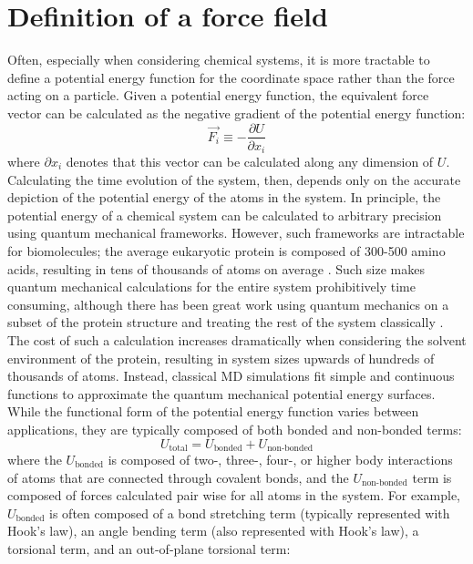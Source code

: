 \section{Definition of a force field}

Often, especially when considering chemical systems, it is more tractable to define a potential energy function for the coordinate space rather than the force acting on a particle. 
Given a potential energy function, the equivalent force vector can be calculated as the negative gradient of the potential energy function: 
\begin{equation} 
    \vec{F_i} \equiv -\frac{\partial U}{\partial x_i}
\end{equation}
where $\partial x_i$ denotes that this vector can be calculated along any dimension of $U$. 
Calculating the time evolution of the system, then, depends only on the accurate depiction of the potential energy of the atoms in the system. 
In principle, the potential energy of a chemical system can be calculated to arbitrary precision using quantum mechanical frameworks. 
However, such frameworks are intractable for biomolecules; the average eukaryotic protein is composed of 300-500 amino acids, resulting in tens of thousands of atoms on average \cite{Kozlowski2017}. 
Such size makes quantum mechanical calculations for the entire system prohibitively time consuming, although there has been great work using quantum mechanics on a subset of the protein structure and treating the rest of the system classically \cite{Senn2009, Tichauer2018}.
The cost of such a calculation increases dramatically when considering the solvent environment of the protein, resulting in system sizes upwards of hundreds of thousands of atoms. 
Instead, classical MD simulations fit simple and continuous functions to approximate the quantum mechanical potential energy surfaces. 
While the functional form of the potential energy function varies between applications, they are typically composed of both bonded and non-bonded terms: 
\begin{equation}
    U_{\text{total}} = U_{\text{bonded}} + U_{\text{non-bonded}}
\end{equation}
where the $U_{\text{bonded}}$ is composed of two-, three-, four-, or higher body interactions of atoms that are connected through covalent bonds, and the $U_{\text{non-bonded}}$ term is composed of forces calculated pair wise for all atoms in the system. 
For example, $U_{\text{bonded}}$ is often composed of a bond stretching term (typically represented with Hook's law), an angle bending term (also represented with Hook's law), a torsional term, and an out-of-plane torsional term: 
